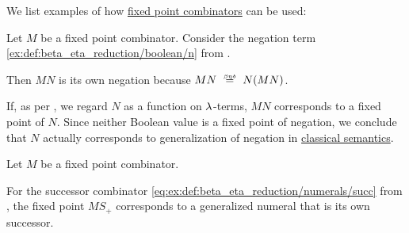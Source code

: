 \begin{example}\label{ex:def:function_fixed_point_combinator}
  We list examples of how \hyperref[def:function_fixed_point_combinator]{fixed point combinators} can be used:
  \begin{thmenum}
     Let \( M \) be a fixed point combinator. Consider the negation term \ref{ex:def:beta_eta_reduction/boolean/n} from .

    Then \( MN \) is its own negation because \( MN \equivrel{\beta\eta\delta} N(MN) \).

    If, as per , we regard \( N \) as a function on \( {\mathrm \lambda} \)-terms, \( MN \) corresponds to a fixed point of \( N \). Since neither Boolean value is a fixed point of negation, we conclude that \( N \) actually corresponds to generalization of negation in \hyperref[def:propositional_semantics/classical]{classical semantics}.

     Let \( M \) be a fixed point combinator.

    For the successor combinator \ref{eq:ex:def:beta_eta_reduction/numerals/succ} from , the fixed point \( MS_+ \) corresponds to a generalized numeral that is its own successor.
  \end{thmenum}
\end{example}

